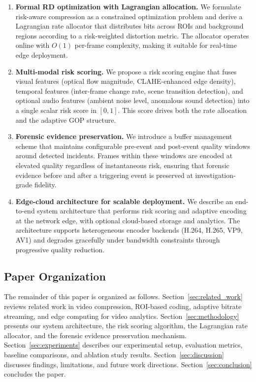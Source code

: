 \begin{enumerate}
    \item \textbf{Formal RD optimization with Lagrangian allocation.} We formulate risk-aware compression as a constrained optimization problem and derive a Lagrangian rate allocator that distributes bits across ROIs and background regions according to a risk-weighted distortion metric. The allocator operates online with $O(1)$ per-frame complexity, making it suitable for real-time edge deployment.

    \item \textbf{Multi-modal risk scoring.} We propose a risk scoring engine that fuses visual features (optical flow magnitude, CLAHE-enhanced edge density), temporal features (inter-frame change rate, scene transition detection), and optional audio features (ambient noise level, anomalous sound detection) into a single scalar risk score in $[0, 1]$. This score drives both the rate allocation and the adaptive GOP structure.

    \item \textbf{Forensic evidence preservation.} We introduce a buffer management scheme that maintains configurable pre-event and post-event quality windows around detected incidents. Frames within these windows are encoded at elevated quality regardless of instantaneous risk, ensuring that forensic evidence before and after a triggering event is preserved at investigation-grade fidelity.

    \item \textbf{Edge-cloud architecture for scalable deployment.} We describe an end-to-end system architecture that performs risk scoring and adaptive encoding at the network edge, with optional cloud-based storage and analytics. The architecture supports heterogeneous encoder backends (H.264, H.265, VP9, AV1) and degrades gracefully under bandwidth constraints through progressive quality reduction.
\end{enumerate}

\subsection{Paper Organization}

The remainder of this paper is organized as follows. Section~\ref{sec:related_work} reviews related work in video compression, ROI-based coding, adaptive bitrate streaming, and edge computing for video analytics. Section~\ref{sec:methodology} presents our system architecture, the risk scoring algorithm, the Lagrangian rate allocator, and the forensic evidence preservation mechanism. Section~\ref{sec:experiments} describes our experimental setup, evaluation metrics, baseline comparisons, and ablation study results. Section~\ref{sec:discussion} discusses findings, limitations, and future work directions. Section~\ref{sec:conclusion} concludes the paper.
